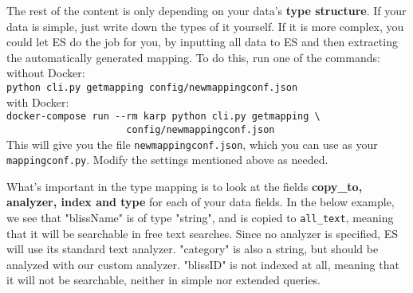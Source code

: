 \documentclass[
12pt, %
a4paper, %
oneside, %
headinclude,footinclude, %
BCOR0mm, %
]{scrartcl}
\begin{document}
   The rest of the content is only depending on your data's \textbf{type structure}.
   If your data is simple, just write down the types of it yourself. If it is
   more complex, you could let ES do the job for you,  by inputting all data to ES and
   then extracting the automatically generated mapping.
   To do this, run one of the commands:\\
   without Docker:\\
   \verb|python cli.py getmapping config/newmappingconf.json|\\
   with Docker:\\
  \verb|docker-compose run --rm karp python cli.py getmapping \|\\
  \verb|                     config/newmappingconf.json|\\
   This will give you the file \verb|newmappingconf.json|, which you can use
   as your \verb|mappingconf.py|. Modify the settings mentioned above as needed.

   What's important in the type mapping is to look at the fields \textbf{copy\_to, analyzer, index and
   type} for each of your data fields.
   In the below example, we see that "blissName" is of type
   "string", and is copied to \verb"all_text", meaning that it will be searchable in free text searches.
   Since no analyzer is specified, ES will use its standard text analyzer.
   "category" is also a string, but should be analyzed with our custom analyzer.
   "blissID" is not indexed at all, meaning that it will not be searchable, neither in simple nor
   extended queries.
\end{document}
